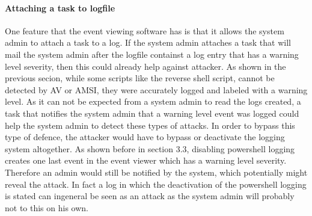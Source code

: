 \documentclass{article}%
\begin{document}
\paragraph{Attaching a task to logfile}\hfill
\newline
One feature that the event viewing software has is that it allows the system admin to attach a task to a log. If the system admin attaches a task that will mail the system admin after the logfile containst a log entry that has a warning level severity, then this could already help against attacker. As shown in the previous secion, while some scripts like the reverse shell script, cannot be detected by AV or AMSI, they were accurately logged and labeled with a warning level. As it can not be expected from a system admin to read the logs created, a task that notifies the system admin that a warning level event was logged could help the system admin to detect these types of attacks. In order to bypass this type of defence, the attacker would have to bypass or deactivate the logging system altogether. As shown before in section $3.3$, disabling powershell logging creates one last event in the event viewer which has a warning level severity. Therefore an admin would still be notified by the system, which potentially might reveal the attack. In fact a log in which the deactivation of the powershell logging is stated can ingeneral be seen as an attack as the system admin will probably not to this on his own.
\end{document}
